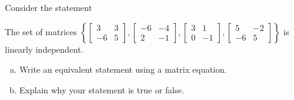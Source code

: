 
\begin{exerciseStatement}


Consider the statement 
\begin{center}\begin{minipage}{0.8\textwidth}
 The set of matrices \( \left\{ \left[\begin{array}{cc}
3 & 3 \\
-6 & 5
\end{array}\right] , \left[\begin{array}{cc}
-6 & -4 \\
2 & -1
\end{array}\right] , \left[\begin{array}{cc}
3 & 1 \\
0 & -1
\end{array}\right] , \left[\begin{array}{cc}
5 & -2 \\
-6 & 5
\end{array}\right] \right\} \) is linearly independent.
\end{minipage}\end{center}
    


\begin{enumerate}[(a)]
\item  Write an equivalent statement using a matrix equation.
\item  Explain why your statement is true or false.
\end{enumerate}
    
\end{exerciseStatement}
    
